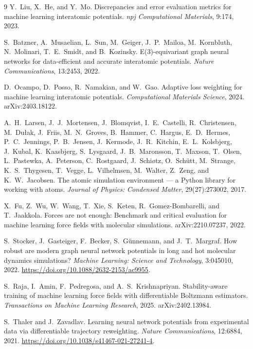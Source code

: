 \documentclass[11pt]{article}
\begin{document}
\begin{thebibliography}{9}
Y.~Liu, X.~He, and Y.~Mo.
\newblock Discrepancies and error evaluation metrics for machine learning
interatomic potentials.
\newblock \emph{npj Computational Materials}, 9:174, 2023.

S.~Batzner, A.~Musaelian, L.~Sun, M.~Geiger, J.~P.~Mailoa, M.~Kornbluth,
N.~Molinari, T.~E.~Smidt, and B.~Kozinsky.
\newblock E(3)-equivariant graph neural networks for data-efficient and
accurate interatomic potentials.
\newblock \emph{Nature Communications}, 13:2453, 2022.

D.~Ocampo, D.~Posso, R.~Namakian, and W.~Gao.
\newblock Adaptive loss weighting for machine learning interatomic
potentials.
\newblock \emph{Computational Materials Science}, 2024.
\newblock arXiv:2403.18122.

A.~H.~Larsen, J.~J.~Mortensen, J.~Blomqvist, I.~E.~Castelli, R.~Christensen,
M.~Du{\l}ak, J.~Friis, M.~N.~Groves, B.~Hammer, C.~Hargus, E.~D.~Hermes,
P.~C.~Jennings, P.~B.~Jensen, J.~Kermode, J.~R.~Kitchin, E.~L.~Kolsbjerg,
J.~Kubal, K.~Kaasbjerg, S.~Lysgaard, J.~B.~Maronsson, T.~Maxson,
T.~Olsen, L.~Pastewka, A.~Peterson, C.~Rostgaard, J.~Schi{\o}tz, O.~Sch{\"u}tt,
M.~Strange, K.~S.~Thygesen, T.~Vegge, L.~Vilhelmsen, M.~Walter, Z.~Zeng, and
K.~W.~Jacobsen.
\newblock The atomic simulation environment --- a Python library for working
with atoms.
\newblock \emph{Journal of Physics: Condensed Matter}, 29(27):273002, 2017.

X.~Fu, Z.~Wu, W.~Wang, T.~Xie, S.~Keten, R.~Gomez-Bombarelli, and T.~Jaakkola.
\newblock Forces are not enough: Benchmark and critical evaluation for
machine learning force fields with molecular simulations.
\newblock arXiv:2210.07237, 2022.

S.~Stocker, J.~Gasteiger, F.~Becker, S.~G{\"u}nnemann, and J.~T.~Margraf.
\newblock How robust are modern graph neural network potentials in long and
hot molecular dynamics simulations?
\newblock \emph{Machine Learning: Science and Technology}, 3:045010, 2022.
\newblock \url{https://doi.org/10.1088/2632-2153/ac9955}.

S.~Raja, I.~Amin, F.~Pedregosa, and A.~S.~Krishnapriyan.
\newblock Stability-aware training of machine learning force fields with
differentiable Boltzmann estimators.
\newblock \emph{Transactions on Machine Learning Research}, 2025.
\newblock arXiv:2402.13984.

S.~Thaler and J.~Zavadlav.
\newblock Learning neural network potentials from experimental data via
differentiable trajectory reweighting.
\newblock \emph{Nature Communications}, 12:6884, 2021.
\newblock \url{https://doi.org/10.1038/s41467-021-27241-4}.


\end{thebibliography}
\end{document}
